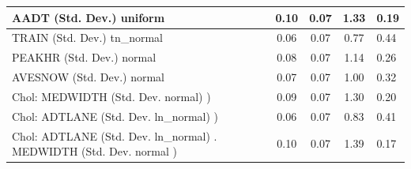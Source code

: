 \begin{table}
\begin{center}
\begin{tabular}{|l|l|c|c|c|l|}
			\hline
			AADT (Std. Dev.) uniform &  & 0.10 & 0.07 & 1.33 & 0.19 \\
			\hline
			TRAIN (Std. Dev.) tn_normal &  & 0.06 & 0.07 & 0.77 & 0.44 \\
			\hline
			PEAKHR (Std. Dev.) normal &  & 0.08 & 0.07 & 1.14 & 0.26 \\
			\hline
			AVESNOW (Std. Dev.) normal &  & 0.07 & 0.07 & 1.00 & 0.32 \\
			\hline
			 Chol: MEDWIDTH (Std. Dev. normal) ) &  & 0.09 & 0.07 & 1.30 & 0.20 \\
			\hline
			 Chol: ADTLANE (Std. Dev. ln_normal) ) &  & 0.06 & 0.07 & 0.83 & 0.41 \\
			\hline
			 Chol: ADTLANE (Std. Dev. ln_normal) . MEDWIDTH (Std. Dev.   normal ) &  & 0.10 & 0.07 & 1.39 & 0.17 \\
			\hline
		\end{tabular}
	\end{center}
\end{table}